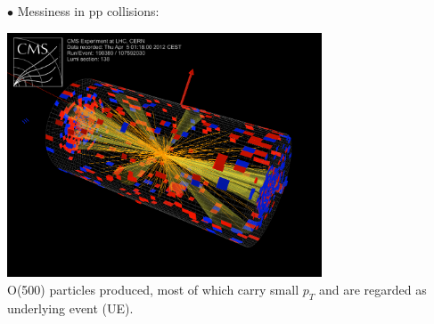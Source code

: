 \documentclass[9pt,a4paper,unknownkeysallowed,xcolor=dvipsnames,aspectratio=43]{beamer}
\begin{document}
\begin{frame}
\vspace{2mm}

{\color{darkred}\Large$\bullet$} Messiness  in pp collisions:\\
\vspace{2mm}
\begin{center}
\includegraphics[width=0.7\textwidth]{pp.png}\\
\vspace{2mm}
O(500) particles produced, most of which carry small $p_T$ and are regarded as {\color{darkred}underlying event (UE)}.
\end{center}
\end{frame}
\end{document}
